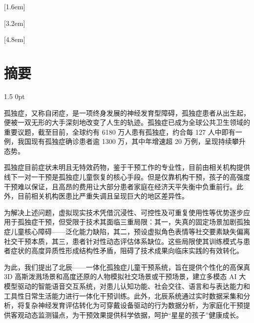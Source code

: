 \documentclass[zihao=-4]{ctexart}
\newcommand{\xiaosi}{\fontsize{12pt}{0}}
\newcommand{\setParDis}{\setlength {\parskip} {0pt} }
\begin{document}
[1.6em]{\addvspace{2pt}\filright}
{\contentspush{\thecontentslabel\hspace{0.8em}}}
{}{\contentspage}

[3.2em]{\addvspace{2pt}\filright}
{\contentspush{\thecontentslabel\hspace{0.8em}}}
{}{\contentspage}

[4.8em]{\addvspace{2pt}\filright}
{\contentspush{\thecontentslabel\hspace{0.8em}}}
{}{\contentspage}

\linespread{1.8}
\setlength{\parskip}{0.5\baselineskip}

\renewcommand{\headrulewidth}{0pt}

\xiaosi
\section*{摘要}
\begin{spacing}{1.5}
  \setParDis %

        孤独症，又称自闭症，是一项终身发展的神经发育型障碍，孤独症患者从出生起，便被一双无形的大手深刻地改变了人生的轨迹。孤独症已成为全球公共卫生领域的重要议题，截至目前，全球约有 6180 万人患有孤独症，约合每 127 人中即有一例，我国现有孤独症确诊患者逾 1300 万，其中年增速超 20 万例，呈现持续攀升态势。

孤独症目前症状未明且无特效药物，鉴于干预工作的专业性，目前由相关机构提供线下一对一干预是孤独症儿童恢复的核心手段。但是仅靠机构干预，孩子的高强度干预难以保证，且高昂的费用让大部分患者家庭在经济天平失衡中负重前行。此外，目前相关机构医患比严重失调且呈现巨大的地区差异性。

为解决上述问题，虚拟现实技术凭借沉浸性、可控性及可重复使用性等优势逐步应用于孤独症干预，但受限于技术其面临三重局限：其一，失真的固定场景加剧孤独症儿童核心障碍——泛化能力缺陷，其二，预设虚拟角色表情等社交要素缺失偏离社交干预本质，其三，患者针对性动态评估体系缺位。这些局限使其训练模式与患者症状的高度异质性形成结构性矛盾，阻碍了技术成果向临床实践的有效转化。

为此，我们提出了北辰——一体化孤独症儿童干预系统，旨在提供个性化的高保真 3D 高斯泼溅场景和高度还原的人物模拟社交场景或干预场景，建立多模态 AI 大模型驱动的智能语音交互系统，对患儿认知功能、社会交往、语言和与表达能力和工具性日常生活能力进行一体化干预训练。此外，北辰系统通过实时数据采集和分析，将复杂神经发育评估转化为可穿戴设备驱动的行为数据分析，为家庭化干预提供客观动态监测锚点，为干预效果提供科学依据，呵护“星星的孩子”健康成长。

 \end{spacing}
\end{document}
